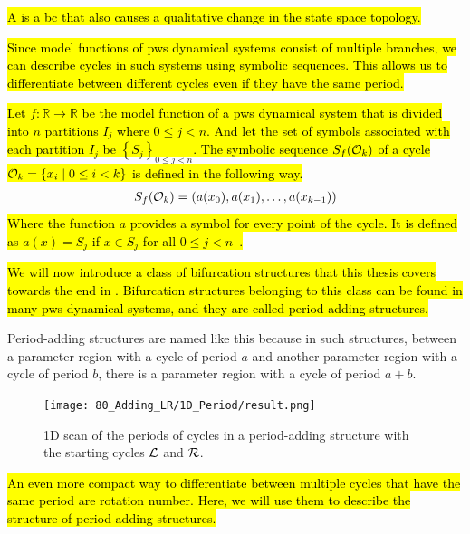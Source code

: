 \begin{definition}
	\hl{
		A  is a \gls{bc} that also causes a qualitative change in the state space topology.
	}
\end{definition}

\hl{
	Since model functions of \gls{pws} dynamical systems consist of multiple branches, we can describe cycles in such systems using symbolic sequences.
	This allows us to differentiate between different cycles even if they have the same period.
}

\begin{definition}
	\hl{
	Let $f: \mathbb{R} \to \mathbb{R}$ be \hl{the model function of a \gls{pws} dynamical system} that is divided into $n$ partitions $I_j$ where $0 \leq j < n$.
	And let the set of symbols associated with each partition $I_j$ be $\left\{S_j\right\}_{0 \leq j < n}$.
	The symbolic sequence $S_f(\mathcal{O}_k)$ of a cycle $\mathcal{O}_k = \left\{x_i \mid 0 \leq i < k\right\}$ is defined in the following way.
	}
	\begin{align}
		S_f(\mathcal{O}_k) = \left(a(x_0), a(x_1), \dots, a(x_{k-1})\right)
	\end{align}
	\hl{
		Where the function $a$ provides a symbol for every point of the cycle.
		It is defined as $a(x) = S_j$ if $x \in S_j$ for all $0 \leq j < n$~\cite{granados14adding}.
	}
\end{definition}

\hl{
	We will now introduce a class of bifurcation structures that this thesis covers towards the end in .
	Bifurcation structures belonging to this class can be found in many \gls{pws} dynamical systems, and they are called period-adding structures.
}

Period-adding structures are named like this because in such structures, between a parameter region with a cycle of period $a$ and another parameter region with a cycle of period $b$, there is a parameter region with a cycle of period $a + b$.

\begin{figure}
	\centering
	\texttt{[image: 80\_Adding\_LR/1D\_Period/result.png]}
	\caption[1D scan of periods in a period-adding structure between $\L$ and $\R$]{
		1D scan of the periods of cycles in a period-adding structure with the starting cycles $\L$ and $\R$.
	}
\end{figure}

\hl{
	An even more compact way to differentiate between multiple cycles that have the same period are rotation number.
	Here, we will use them to describe the structure of period-adding structures.
}

